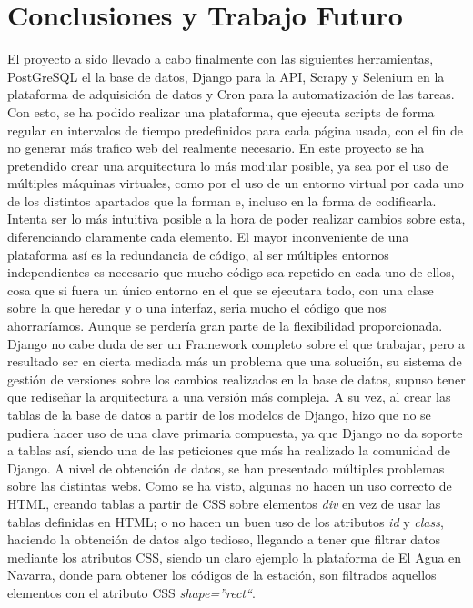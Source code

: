 \chapter[Conclusiones y Trabajo Futuro]{Conclusiones y Trabajo Futuro}
\label{Chap6}

El proyecto a sido llevado a cabo finalmente con las siguientes herramientas, PostGreSQL el la base de datos, Django para la API, Scrapy y Selenium en la plataforma de adquisición de datos y Cron para la automatización de las tareas. Con esto, se ha podido realizar una plataforma, que ejecuta scripts de forma regular en intervalos de tiempo predefinidos para cada página usada, con el fin de no generar más trafico web del realmente necesario.\newline
\newline
En este proyecto se ha pretendido crear una arquitectura lo más modular posible, ya sea por el uso de múltiples máquinas virtuales, como por el uso de un entorno virtual por cada uno de los distintos apartados que la forman e, incluso en la forma de codificarla. Intenta ser lo más intuitiva posible a la hora de poder realizar cambios sobre esta, diferenciando claramente cada elemento.\newline
\newline
El mayor inconveniente de una plataforma así es la redundancia de código, al ser múltiples entornos independientes es necesario que mucho código sea repetido en cada uno de ellos, cosa que si fuera un único entorno en el que se ejecutara todo, con una clase sobre la que heredar y o una interfaz, seria mucho el código que nos ahorraríamos. Aunque se perdería gran parte de la flexibilidad proporcionada.\newline
\newline
Django no cabe duda de ser un Framework completo sobre el que trabajar, pero a resultado ser en cierta mediada más un problema que una solución, su sistema de gestión de versiones sobre los cambios realizados en la base de datos, supuso tener que rediseñar la arquitectura a una versión más compleja. A su vez, al crear las tablas de la base de datos a partir de los modelos de Django, hizo que no se pudiera hacer uso de una clave primaria compuesta, ya que Django no da soporte a tablas así, siendo una de las peticiones que más ha realizado la comunidad de Django.\newline
\newline
A nivel de obtención de datos, se han presentado múltiples problemas sobre las distintas webs. Como se ha visto, algunas no hacen un uso correcto de HTML, creando tablas a partir de CSS sobre elementos \textit{div} en vez de usar las tablas definidas en HTML; o no hacen un buen uso de los atributos \textit{id} y \textit{class}, haciendo la obtención de datos algo tedioso, llegando a tener que filtrar datos mediante los atributos CSS, siendo un claro ejemplo la plataforma de El Agua en Navarra, donde para obtener los códigos de la estación, son filtrados aquellos elementos con el atributo CSS \textit{shape=''rect``}.\newline
